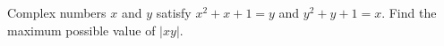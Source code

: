 Complex numbers $x$ and $y$ satisfy $x^2+x+1=y$ and $y^2+y+1=x$. Find the maximum possible value of $|xy|$.
